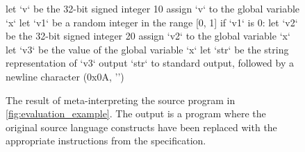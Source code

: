 \begin{figure}
  \begin{plain}
let `v` be the 32-bit signed integer 10
assign `v` to the global variable `x`
let `v1` be a random integer in the range [0, 1]
if `v1` is 0:
  let `v2` be the 32-bit signed integer 20
  assign `v2` to the global variable `x`
let `v3` be the value of the global variable `x`
let `str` be the string representation of `v3`
output `str` to standard output, followed by a newline character (0x0A, '\n')
  \end{plain}
  \caption{The result of meta-interpreting the source program in \cref{fig:evaluation_example}. The output is a program where the original source language constructs have been replaced with the appropriate instructions from the specification.}
  \label{fig:evaluation_example_meta_interpreted}
\end{figure}